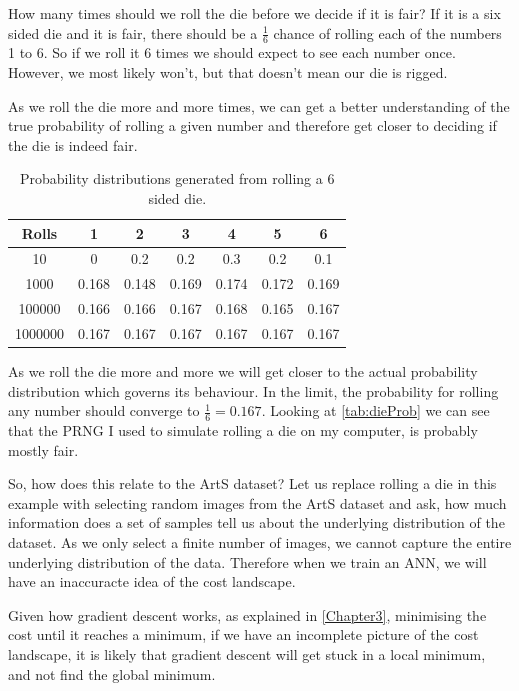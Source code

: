How many times should we roll the die before we decide if it is fair? If it is a six sided die and it is fair, there should be a $\frac{1}{6}$ chance of rolling each of the numbers 1 to 6. So if we roll it 6 times we should expect to see each number once. However, we most likely won't, but that doesn't mean our die is rigged.

As we roll the die more and more times, we can get a better understanding of the true probability of rolling a given number and therefore get closer to deciding if the die is indeed fair.

\begin{table}[h]
\centering
	\begin{tabular}{|c|c|c|c|c|c|c|}
	\hline
	\textbf{Rolls} & \textbf{1} & \textbf{2} & \textbf{3} & \textbf{4} & \textbf{5} & \textbf{6} \\ \hline
	10 & 0 & 0.2 & 0.2 & 0.3 & 0.2 & 0.1 \\ \hline
	1000 & 0.168 & 0.148 & 0.169 & 0.174 & 0.172 & 0.169  \\ \hline
	100000 & 0.166 & 0.166 & 0.167 & 0.168 & 0.165 & 0.167  \\ \hline
	1000000 & 0.167 & 0.167 & 0.167 & 0.167 & 0.167 & 0.167  \\ \hline
	\end{tabular}
	\caption{Probability distributions generated from rolling a 6 sided die.}
	\label{tab:dieProb}
\end{table}

As we roll the die more and more we will get closer to the actual probability distribution which governs its behaviour. In the limit, the probability for rolling any number should converge to $\frac{1}{6} = 0.167$. Looking at \autoref{tab:dieProb} we can see that the \ac{PRNG} I used to simulate rolling a die on my computer, is probably mostly fair. 

So, how does this relate to the ArtS dataset? Let us replace rolling a die in this example with selecting random images from the ArtS dataset and ask, how much information does a set of samples tell us about the underlying distribution of the dataset. As we only select a finite number of images, we cannot capture the entire underlying distribution of the data. Therefore when we train an \ac{ANN}, we will have an inaccuracte idea of the cost landscape.

Given how gradient descent works, as explained in \autoref{Chapter3},  minimising the cost until it reaches a minimum, if we have an incomplete picture of the cost landscape, it is likely that gradient descent will get stuck in a local minimum, and not find the global minimum.

